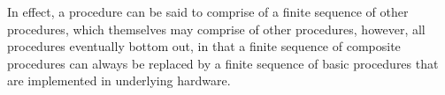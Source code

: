 In effect, a procedure can be said to comprise of a finite sequence of other
procedures, which themselves may comprise of other procedures, however, all
procedures eventually bottom out, in that a finite sequence of composite
procedures can always be replaced by a finite sequence of basic procedures that
are implemented in underlying hardware.











